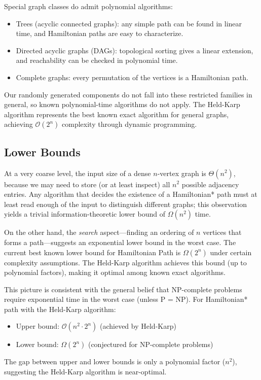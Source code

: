 \documentclass[11pt]{article}
\begin{document}
Special graph classes do admit polynomial algorithms:
\begin{itemize}[left=1.2em]
	\item Trees (acyclic connected graphs): any simple path can be found in linear time, and Hamiltonian paths are easy to characterize.
	\item Directed acyclic graphs (DAGs): topological sorting gives a linear extension, and reachability can be checked in polynomial time.
	\item Complete graphs: every permutation of the vertices is a Hamiltonian path.
\end{itemize}
Our randomly generated components do not fall into these restricted families in general, so known polynomial-time algorithms do not apply. The Held-Karp algorithm represents the best known exact algorithm for general graphs, achieving $\mathcal{O}(2^n)$ complexity through dynamic programming.

\subsection*{Lower Bounds}
At a very coarse level, the input size of a dense $n$-vertex graph is $\Theta(n^2)$, because we may need to store (or at least inspect) all $n^2$ possible adjacency entries. Any algorithm that decides the existence of a Hamiltonian* path must at least read enough of the input to distinguish different graphs; this observation yields a trivial information-theoretic lower bound of $\Omega(n^2)$ time.

On the other hand, the \emph{search} aspect---finding an ordering of $n$ vertices that forms a path---suggests an exponential lower bound in the worst case. The current best known lower bound for Hamiltonian Path is $\Omega(2^n)$ under certain complexity assumptions. The Held-Karp algorithm achieves this bound (up to polynomial factors), making it optimal among known exact algorithms.

This picture is consistent with the general belief that NP-complete problems require exponential time in the worst case (unless P = NP). For Hamiltonian* path with the Held-Karp algorithm:
\begin{itemize}[left=1.2em]
	\item Upper bound: $\mathcal{O}(n^2 \cdot 2^n)$ (achieved by Held-Karp)
	\item Lower bound: $\Omega(2^n)$ (conjectured for NP-complete problems)
\end{itemize}
The gap between upper and lower bounds is only a polynomial factor ($n^2$), suggesting the Held-Karp algorithm is near-optimal.
\end{document}
